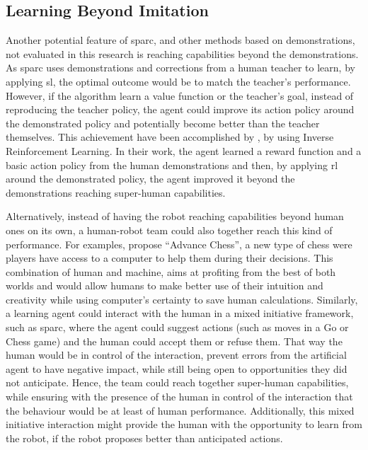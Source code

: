 
\subsection{Learning Beyond Imitation}\label{sec:disc_beyond}
Another potential feature of \gls{sparc}, and other methods based on demonstrations, not evaluated in this research is reaching capabilities beyond the demonstrations. As \gls{sparc} uses demonstrations and corrections from a human teacher to learn, by applying \gls{sl}, the optimal outcome would be to match the teacher's performance. However, if the algorithm learn a value function or the teacher's goal, instead of reproducing the teacher policy, the agent could improve its action policy around the demonstrated policy and potentially become better than the teacher themselves. This achievement have been accomplished by \cite{abbeel2004apprenticeship}, by using Inverse Reinforcement Learning. In their work, the agent learned a reward function and a basic action policy from the human demonstrations and then, by applying \gls{rl} around the demonstrated policy, the agent improved it beyond the demonstrations reaching super-human capabilities. 

Alternatively, instead of having the robot reaching capabilities beyond human ones on its own, a human-robot team could also together reach this kind of performance. For examples, \cite{kasparov2010chess} propose ``Advance Chess'', a new type of chess were players have access to a computer to help them during their decisions. This combination of human and machine, aims at profiting from the best of both worlds and would allow humans to make better use of their intuition and creativity while using computer's certainty to save human calculations. Similarly, a learning agent could interact with the human in a mixed initiative framework, such as \gls{sparc}, where the agent could suggest actions (such as moves in a Go or Chess game) and the human could accept them or refuse them. That way the human would be in control of the interaction, prevent errors from the artificial agent to have negative impact, while still being open to opportunities they did not anticipate. Hence, the team could reach together super-human capabilities, while ensuring with the presence of the human in control of the interaction that the behaviour would be at least of human performance. Additionally, this mixed initiative interaction might provide the human with the opportunity to learn from the robot, if the robot proposes better than anticipated actions.


